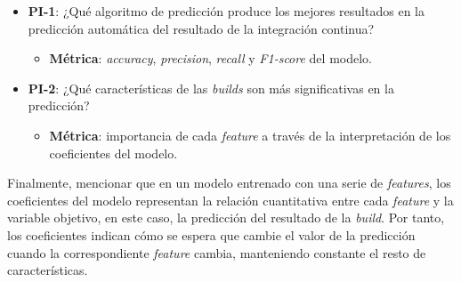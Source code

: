 \begin{itemize}
    \item \textbf{PI-1}: ¿Qué algoritmo de predicción produce los mejores resultados en la
          predicción automática del resultado de la integración continua?\\
          \begin{itemize}
            \item \textbf{Métrica}: \textit{accuracy}, \textit{precision}, \textit{recall} y
                  \textit{F1-score} del modelo.\\
          \end{itemize}

    \item \textbf{PI-2}: ¿Qué características de las \textit{builds} son más significativas en
          la predicción?\\

          \begin{itemize}
            \item \textbf{Métrica}: importancia de cada \textit{feature} a través de la
            interpretación de los coeficientes del modelo.
          \end{itemize}
\end{itemize}

Finalmente, mencionar que en un modelo entrenado con una serie de \textit{features}, los
coeficientes del modelo representan la relación cuantitativa entre cada \textit{feature} y la
variable objetivo, en este caso, la predicción del resultado de la \textit{build}. Por tanto, los
coeficientes indican cómo se espera que cambie el valor de la predicción cuando la correspondiente
\textit{feature} cambia, manteniendo constante el resto de características.